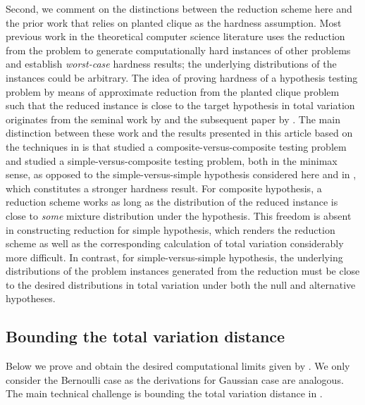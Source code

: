 Second, we comment on the distinctions between the reduction scheme here and the prior work that relies on planted clique as the hardness assumption. Most previous work \cite{Hazan2011Nash,AAK07,Alon11,ABW10} in the theoretical computer science
literature uses the reduction from the \PC  problem to generate computationally hard instances of other problems and establish \emph{worst-case} hardness results; the underlying distributions of the instances could be arbitrary. The idea of proving hardness of a hypothesis testing problem by means of approximate reduction from the planted clique problem such that the reduced instance is close to the target hypothesis in total variation originates from the seminal work by \cite{berthet2013lowerSparsePCA} and the subsequent paper by \cite{ma2013submatrix}.
The main distinction between these work and the results presented in this article based on the techniques in \cite{HajekWuXu14} is that  \cite{berthet2013lowerSparsePCA} studied a composite-versus-composite testing problem and \cite{ma2013submatrix} studied a simple-versus-composite testing problem, both in the minimax sense, as opposed to the simple-versus-simple hypothesis considered here and in \cite{HajekWuXu14}, which constitutes a stronger hardness result. For composite hypothesis, a reduction scheme works as long as the distribution of the reduced instance is close to \emph{some} mixture distribution under the hypothesis. This freedom is absent in constructing reduction for simple hypothesis, which renders the reduction scheme as well as the corresponding calculation of total variation considerably more difficult.  In contrast, for simple-versus-simple hypothesis, the underlying distributions of the problem instances generated from the reduction must be close to the desired distributions in total variation under both the null and alternative hypotheses.



\subsection{Bounding the total variation distance}
\label{sec:tv_bound}

Below we prove  and obtain the desired computational limits given by . We only consider the Bernoulli case as the derivations for Gaussian case are analogous. The main technical challenge is bounding the total variation distance in . 


